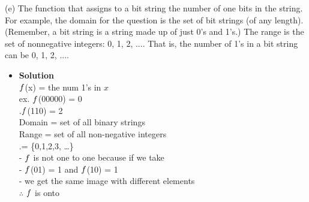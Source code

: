 \documentclass[11pt]{article}
\begin{document}
\begin{enumerate}

\begin{flushleft}
\end{flushleft}


\large (e) The function that assigns to a bit string the number of one bits in the string.
For example, the domain for the question is the set of bit strings (of any length). (Remember, a
bit string is a string made up of just 0’s and 1’s.) The range is the set of nonnegative integers:
{0, 1, 2, ...}. That is, the number of 1’s in a bit string can be 0, 1, 2, ....\\

\begin{itemize}
\item \textbf{Solution}\\
\large $\mathnormal{f}$(x) = the num 1's in $x$\\
\large ex. $\mathnormal{f}$(00000) = 0\\
\large .\hspace{.5cm}$\mathnormal{f}$(110) = 2\\
\large Domain = set of all binary strings\\
\large Range = set of all non-negative integers\\
\large .\hspace{1.1cm}= \{0,1,2,3, \dots \}\\
\large - $\mathnormal{f}$ is not one to one because
if we take \\
\large - $\mathnormal{f}$(01) = 1 and 
$\mathnormal{f}$(10) = 1\\
\large - we get the same image with different elements\\
\large $\therefore$ $\mathnormal{f}$ is onto\\

\end {itemize}
\end {enumerate}





\pagebreak




\end{document}
